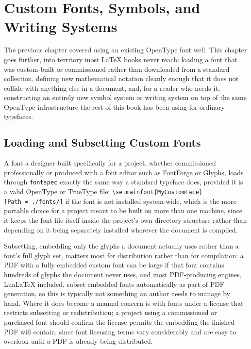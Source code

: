 \hypertarget{chapter-10-custom-fonts-symbols-and-writing-systems}{%
\chapter{Custom Fonts, Symbols, and Writing Systems}\label{chapter-10-custom-fonts-symbols-and-writing-systems}}

The previous chapter covered using an existing OpenType font well. This chapter goes further, into territory most LaTeX books never reach: loading a font that was custom-built or commissioned rather than downloaded from a standard collection, defining new mathematical notation cleanly enough that it does not collide with anything else in a document, and, for a reader who needs it, constructing an entirely new symbol system or writing system on top of the same OpenType infrastructure the rest of this book has been using for ordinary typefaces.

\hypertarget{loading-and-subsetting-custom-fonts}{%
\section{Loading and Subsetting Custom Fonts}\label{loading-and-subsetting-custom-fonts}}

A font a designer built specifically for a project, whether commissioned professionally or produced with a font editor such as FontForge or Glyphs, loads through \texttt{fontspec} exactly the same way a standard typeface does, provided it is a valid OpenType or TrueType file: \texttt{\textbackslash{}setmainfont\{MyCustomFace\}{[}Path\ =\ ./fonts/{]}} if the font is not installed system-wide, which is the more portable choice for a project meant to be built on more than one machine, since it keeps the font file itself inside the project's own directory structure rather than depending on it being separately installed wherever the document is compiled.

Subsetting, embedding only the glyphs a document actually uses rather than a font's full glyph set, matters most for distribution rather than for compilation: a PDF with a fully embedded custom font can be large if that font contains hundreds of glyphs the document never uses, and most PDF-producing engines, LuaLaTeX included, subset embedded fonts automatically as part of PDF generation, so this is typically not something an author needs to manage by hand. Where it does become a manual concern is with fonts under a license that restricts subsetting or redistribution; a project using a commissioned or purchased font should confirm the license permits the embedding the finished PDF will contain, since font licensing terms vary considerably and are easy to overlook until a PDF is already being distributed.

